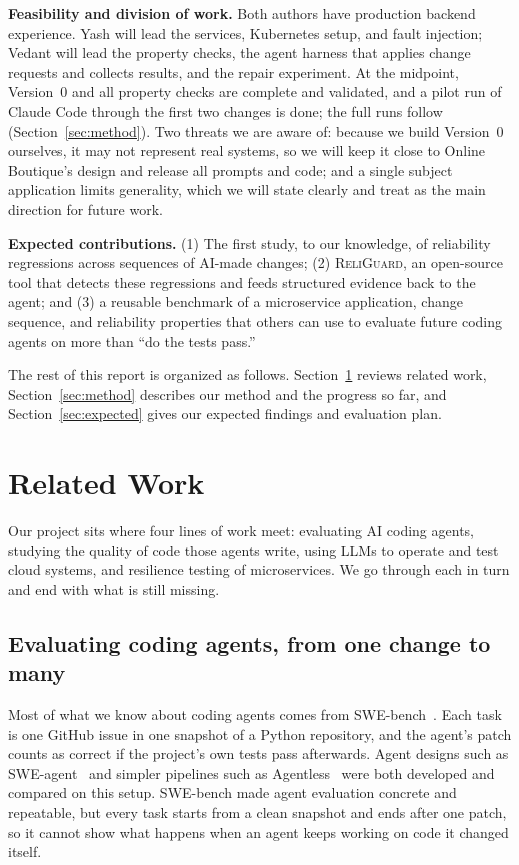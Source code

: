 \documentclass[sigconf,review]{acmart}
\begin{document}
\textbf{Feasibility and division of work.} Both authors have production
backend experience. Yash will lead the services, Kubernetes
setup, and fault injection; Vedant will lead the property checks, the
agent harness that applies change requests and collects results, and
the repair experiment. At the midpoint, Version~0 and all property checks are complete
and validated, and a pilot run of Claude Code through the first two
changes is done; the full runs follow (Section~\ref{sec:method}). Two threats we are aware of: because we build
Version~0 ourselves, it may not represent real systems, so we will
keep it close to Online Boutique's design and release all prompts
and code; and a single subject application limits generality, which
we will state clearly and treat as the main direction for future work.

\textbf{Expected contributions.} (1) The first study, to our knowledge,
of reliability regressions across sequences of AI-made changes; (2)
\textsc{ReliGuard}, an open-source tool that detects these regressions and
feeds structured evidence back to the agent; and (3) a reusable
benchmark of a microservice application, change sequence, and
reliability properties that others can use to evaluate future coding
agents on more than ``do the tests pass.''

The rest of this report is organized as follows. Section~\ref{sec:related} reviews related work,
Section~\ref{sec:method} describes our method and the progress so far, and
Section~\ref{sec:expected} gives our expected findings and evaluation plan.

\section{Related Work}
\label{sec:related}

Our project sits where four lines of work meet: evaluating AI coding agents, studying the quality
of code those agents write, using LLMs to operate and test cloud systems, and resilience testing of
microservices. We go through each in turn and end with what is still missing.

\subsection{Evaluating coding agents, from one change to many}

Most of what we know about coding agents comes from SWE-bench~\cite{jimenez2024swebench}. Each task
is one GitHub issue in one snapshot of a Python repository, and the agent's patch counts as correct
if the project's own tests pass afterwards. Agent designs such as SWE-agent~\cite{yang2024sweagent}
and simpler pipelines such as Agentless~\cite{xia2025agentless} were both developed and compared on
this setup. SWE-bench made agent evaluation concrete and repeatable, but every task starts from a
clean snapshot and ends after one patch, so it cannot show what happens when an agent keeps working
on code it changed itself.
\end{document}
